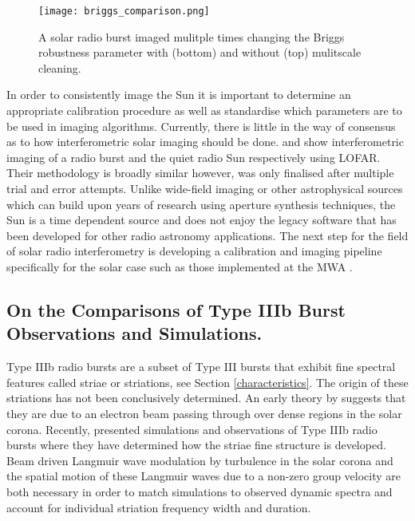 \begin{figure}[ht]
\centering
\texttt{[image: briggs\_comparison.png]}
\caption[An example of the same solar radio burst imaged with different weighting parameters.]{A solar radio burst imaged mulitple times changing the Briggs robustness parameter with (bottom) and without (top) mulitscale cleaning.}
\label{fig:briggs_comparison}
\end{figure}


In order to consistently image the Sun it is important to determine an appropriate calibration procedure as well as standardise which parameters are to be used in imaging algorithms. Currently, there is little in the way of consensus as to how interferometric solar imaging should be done. \cite{Maguire2021} and \cite{Ryan2021} show interferometric imaging of a radio burst and the quiet radio Sun respectively using LOFAR. Their methodology is broadly similar however, was only finalised after multiple trial and error attempts. Unlike wide-field imaging or other astrophysical sources which can build upon years of research using aperture synthesis techniques, the Sun is a time dependent source and does not enjoy the legacy software that has been developed for other radio astronomy applications. The next step for the field of solar radio interferometry is developing a calibration and imaging pipeline specifically for the solar case such as those implemented at the MWA \citep[e.g.][]{Mondal2019}.

\subsection{On the Comparisons of Type IIIb Burst Observations and Simulations.}
Type IIIb radio bursts are a subset of Type III bursts that exhibit fine spectral features called striae or striations, see Section \ref{characteristics}. The origin of these striations has not been conclusively determined. An early theory by \cite{Takakura1975} suggests that they are due to an electron beam passing through over dense regions in the solar corona. Recently, \cite{Reid2021} presented simulations and observations of Type IIIb radio bursts where they have determined how the striae fine structure is developed. Beam driven Langmuir wave modulation by turbulence in the solar corona and the spatial motion of these Langmuir waves due to a non-zero group velocity are both necessary in order to match simulations to observed dynamic spectra and account for individual striation frequency width and duration.

